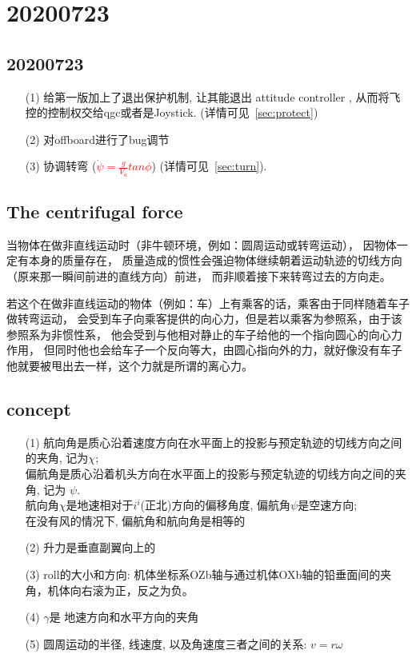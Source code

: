     \chapter{20200723}
    \section{20200723}
    \begin{itemize}
        \item[(1)] 给第一版加上了退出保护机制, 让其能退出 attitude controller , 从而将飞控的控制权交给qgc或者是Joystick. (详情可见~\ref{sec:protect})
        \item[(2)] 对offboard进行了bug调节 
        \item[(3)] 协调转弯 (\textcolor{red}{$\dot{\psi} = \frac{g}{V_{a}} tan \phi $}) (详情可见~\ref{sec:turn}).
    \end{itemize}
    \clearpage

    \section{The centrifugal force}
    当物体在做非直线运动时（非牛顿环境，例如：圆周运动或转弯运动），
    因物体一定有本身的质量存在，
    质量造成的惯性会强迫物体继续朝着运动轨迹的切线方向（原来那一瞬间前进的直线方向）前进，
    而非顺着接下来转弯过去的方向走。
    \par 若这个在做非直线运动的物体（例如：车）上有乘客的话，乘客由于同样随着车子做转弯运动，
    会受到车子向乘客提供的向心力，但是若以乘客为参照系，由于该参照系为非惯性系，
    他会受到与他相对静止的车子给他的一个指向圆心的向心力作用，
    但同时他也会给车子一个反向等大，由圆心指向外的力，就好像没有车子他就要被甩出去一样，这个力就是所谓的离心力。
    \section{concept}
    \begin{itemize}
        \item[(1)] 航向角是质心沿着速度方向在水平面上的投影与预定轨迹的切线方向之间的夹角, 记为$\chi$; \\ 偏航角是质心沿着机头方向在水平面上的投影与预定轨迹的切线方向之间的夹角, 记为 $\psi$.\\
        航向角$\chi$是地速相对于$i^{i}$(正北)方向的偏移角度, 偏航角$\psi$是空速方向; \\在没有风的情况下, 偏航角和航向角是相等的
        \item[(2)] 升力是垂直副翼向上的
        \item[(3)] roll的大小和方向: 机体坐标系OZb轴与通过机体OXb轴的铅垂面间的夹角，机体向右滚为正，反之为负。
        \item[(4)] $\gamma$是 地速方向和水平方向的夹角
        \item[(5)] 圆周运动的半径, 线速度, 以及角速度三者之间的关系: $v = r \omega$
    \end{itemize}
    \clearpage
    \setcounter{page}{1}        %
